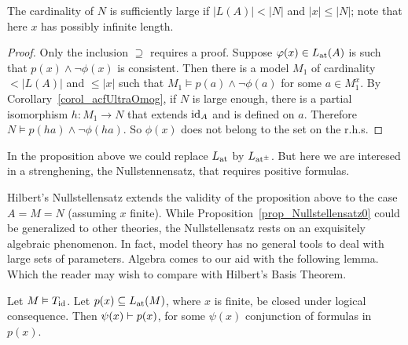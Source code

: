 The cardinality of $N$ is sufficiently large if $|L(A)|<|N|$ and $|x|\le |N|$; note that here $x$ has possibly infinite length.

\vspace*{-\parskip}
\begin{proof} 
  Only the inclusion $\supseteq$ requires a proof.
  Suppose $\phi(x)\in\atL(A)$ is such that $p(x)\wedge \neg\phi(x)$ is consistent.
  Then there is a model $M_1$ of cardinality $<|L(A)|$ and $\le |x|$ such that $M_1\models p(a)\wedge \neg\phi(a)$ for some $a\in M_1^{x}$.
  By Corollary~\ref{corol_acfUltraOmog}, if $N$ is large enough, there is a partial isomorphism $h:M_1\to N$ that extends $\id_A$ and is defined on $a$.
  Therefore $N\models p(ha)\wedge\neg\phi(ha)$.
  So $\phi(x)$ does not belong to the set on the r.h.s.
\end{proof}

In the proposition above we could replace $\atL$ by $\atpmL$.
But here we are interesed in a strenghening, the Nullstennensatz, that requires positive formulas.

Hilbert's Nullstellensatz extends the validity of the proposition above to the case $A=M=N$ (assuming $x$ finite). 
While Proposition~\ref{prop_Nullstellensatz0} could be generalized to other theories, the Nullstellensatz rests on an exquisitely algebraic phenomenon.
In fact, model theory has no general tools to deal with large sets of parameters.
Algebra comes to our aid with the following lemma.
Which the reader may wish to compare with Hilbert's Basis Theorem.

\begin{lemma}\label{lem_basisthm}
  Let $M\models T_{\rm id}$.
  Let $p(x)\subseteq\atL(M)$, where $x$ is finite, be closed under  logical consequence. 
  Then $\psi(x)\proves p(x)$, for some $\psi(x)$ conjunction of formulas in $p(x)$.
\end{lemma}

